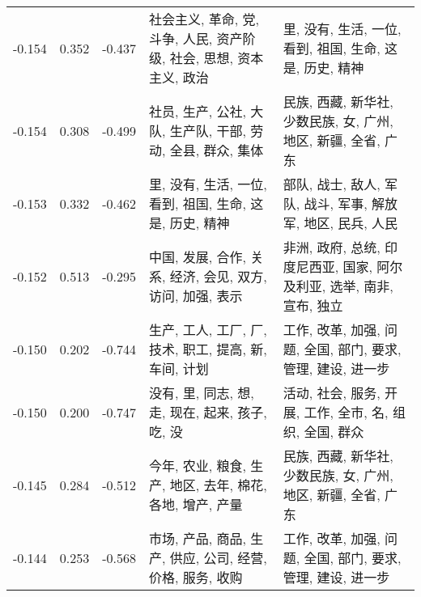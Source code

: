 \begin{tabular}{cccp{5cm}p{5cm}}
-0.154 & 0.352 & -0.437 & 社会主义, 革命, 党, 斗争, 人民, 资产阶级, 社会, 思想, 资本主义, 政治 & 里, 没有, 生活, 一位, 看到, 祖国, 生命, 这是, 历史, 精神 \\
-0.154 & 0.308 & -0.499 & 社员, 生产, 公社, 大队, 生产队, 干部, 劳动, 全县, 群众, 集体 & 民族, 西藏, 新华社, 少数民族, 女, 广州, 地区, 新疆, 全省, 广东 \\
-0.153 & 0.332 & -0.462 & 里, 没有, 生活, 一位, 看到, 祖国, 生命, 这是, 历史, 精神 & 部队, 战士, 敌人, 军队, 战斗, 军事, 解放军, 地区, 民兵, 人民 \\
-0.152 & 0.513 & -0.295 & 中国, 发展, 合作, 关系, 经济, 会见, 双方, 访问, 加强, 表示 & 非洲, 政府, 总统, 印度尼西亚, 国家, 阿尔及利亚, 选举, 南非, 宣布, 独立 \\
-0.150 & 0.202 & -0.744 & 生产, 工人, 工厂, 厂, 技术, 职工, 提高, 新, 车间, 计划 & 工作, 改革, 加强, 问题, 全国, 部门, 要求, 管理, 建设, 进一步 \\
-0.150 & 0.200 & -0.747 & 没有, 里, 同志, 想, 走, 现在, 起来, 孩子, 吃, 没 & 活动, 社会, 服务, 开展, 工作, 全市, 名, 组织, 全国, 群众 \\
-0.145 & 0.284 & -0.512 & 今年, 农业, 粮食, 生产, 地区, 去年, 棉花, 各地, 增产, 产量 & 民族, 西藏, 新华社, 少数民族, 女, 广州, 地区, 新疆, 全省, 广东 \\
-0.144 & 0.253 & -0.568 & 市场, 产品, 商品, 生产, 供应, 公司, 经营, 价格, 服务, 收购 & 工作, 改革, 加强, 问题, 全国, 部门, 要求, 管理, 建设, 进一步 \\
\bottomrule
\end{tabular}
